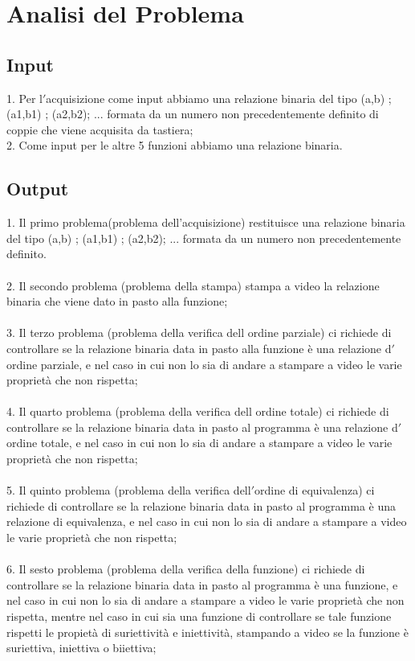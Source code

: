 \documentclass[11pt, a4paper, titlepage, block]{article}
\begin{document}
	\section{Analisi del Problema}
	\subsection{Input}
	
	
	1. Per l$'$acquisizione come input abbiamo una relazione binaria del tipo {(a,b) ; (a1,b1) ; (a2,b2); ...} formata da un numero non precedentemente definito di coppie che viene acquisita da tastiera;\\
	2. Come input per le altre 5 funzioni abbiamo una relazione binaria.\\
	\subsection{Output}
	
	
	1. Il primo problema(problema dell'acquisizione) restituisce una relazione binaria del tipo {(a,b) ; (a1,b1) ; (a2,b2); ...} formata da un numero non precedentemente definito.\\
	\\
	2. Il secondo problema (problema della stampa) stampa a video la relazione binaria che viene dato in pasto alla funzione;\\
	\\
	3. Il terzo problema (problema della verifica dell ordine parziale) ci richiede di controllare se la relazione binaria data in pasto alla funzione \`e una relazione d$'$ordine parziale, e nel caso in cui non lo sia di andare a stampare a video le varie propriet\`a che non rispetta;\\
	\\
	4. Il quarto problema (problema della verifica dell ordine totale) ci richiede di controllare se la relazione binaria data in pasto al programma \`e una relazione d$'$ordine totale, e nel caso in cui non lo sia di andare a stampare a video le varie propriet\`a che non rispetta;\\
	\\
	5. Il quinto problema (problema della verifica dell$'$ordine di equivalenza) ci richiede di controllare se la relazione binaria data in pasto al programma \`e una relazione di equivalenza, e nel caso in cui non lo sia di andare a stampare a video le varie propriet\`a che non rispetta;\\
	\\
	6. Il sesto problema (problema della verifica della funzione) ci richiede di controllare se la relazione binaria data in pasto al programma \`e una funzione, e nel caso in cui non lo sia di andare a stampare a video le varie propriet\`a che non rispetta, mentre nel caso in cui sia una funzione di controllare se tale funzione rispetti le propiet\`a di suriettivit\`a e iniettivit\`a, stampando a video se la funzione \`e suriettiva, iniettiva o biiettiva;\\
	
\end{document}
